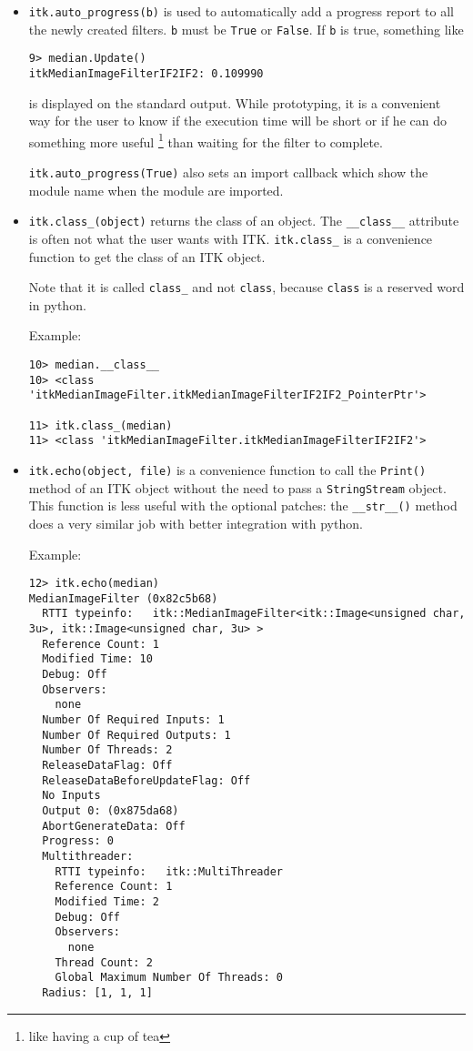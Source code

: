 \documentclass{InsightArticle}
\begin{document}
\begin{itemize}
  \item \verb$itk.auto_progress(b)$ is used to automatically add a progress report
to all the newly created filters. \verb$b$ must be \verb$True$ or \verb$False$. If
\verb$b$ is true, something like
\begin{verbatim}
9> median.Update()
itkMedianImageFilterIF2IF2: 0.109990
\end{verbatim}
is displayed on the standard output.
While prototyping, it is a convenient way for the user to know if
the execution time will be short or if he can do something more useful
\footnote{like having a cup of tea} than waiting for the filter to complete.

\verb$itk.auto_progress(True)$ also sets an import callback which show the module name when
the module are imported.

  \item \verb$itk.class_(object)$ returns the class of an object. The \verb$__class__$
attribute is often not what the user wants with ITK. \verb$itk.class_$ is a convenience
function to get the class of an ITK object.

Note that it is called \verb$class_$ and not \verb$class$, because \verb$class$ is a
reserved word in python.

Example:
\begin{verbatim}
10> median.__class__
10> <class 'itkMedianImageFilter.itkMedianImageFilterIF2IF2_PointerPtr'>

11> itk.class_(median)
11> <class 'itkMedianImageFilter.itkMedianImageFilterIF2IF2'>
\end{verbatim}

  \item \verb$itk.echo(object, file)$ is a convenience function to call the \verb$Print()$
method of an ITK object without the need to pass a \verb$StringStream$ object.
This function is less useful with the optional patches: the \verb$__str__()$
method does a very similar job with better integration with python.

Example:

\begin{verbatim}
12> itk.echo(median)
MedianImageFilter (0x82c5b68)
  RTTI typeinfo:   itk::MedianImageFilter<itk::Image<unsigned char, 3u>, itk::Image<unsigned char, 3u> >
  Reference Count: 1
  Modified Time: 10
  Debug: Off
  Observers:
    none
  Number Of Required Inputs: 1
  Number Of Required Outputs: 1
  Number Of Threads: 2
  ReleaseDataFlag: Off
  ReleaseDataBeforeUpdateFlag: Off
  No Inputs
  Output 0: (0x875da68)
  AbortGenerateData: Off
  Progress: 0
  Multithreader:
    RTTI typeinfo:   itk::MultiThreader
    Reference Count: 1
    Modified Time: 2
    Debug: Off
    Observers:
      none
    Thread Count: 2
    Global Maximum Number Of Threads: 0
  Radius: [1, 1, 1]
\end{verbatim}



\end{itemize}
\end{document}

